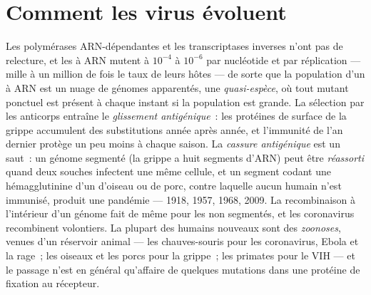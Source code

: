 \section{Comment les virus évoluent}

\begin{definition}\label{def:b3:virology:evolution}
Les polymérases ARN-dépendantes et les transcriptases inverses n'ont
pas de relecture, et les  à ARN mutent à $10^{-4}$ à $10^{-6}$ par
nucléotide et par réplication --- mille à un million de fois le taux de
leurs hôtes --- de sorte que la population d'un  à ARN est un nuage
de génomes apparentés, une \emph{quasi-espèce}, où tout mutant ponctuel
est présent à chaque instant si la population est grande. La sélection
par les anticorps entraîne le \emph{glissement antigénique}~: les
protéines de surface de la grippe accumulent des substitutions année
après année, et l'immunité de l'an dernier protège un peu moins à
chaque saison. La \emph{cassure antigénique} est un saut~: un génome
segmenté (la grippe a huit segments d'ARN) peut être \emph{réassorti}
quand deux souches infectent une même cellule, et un segment codant une
hémagglutinine d'un  d'oiseau ou de porc, contre laquelle aucun
humain n'est immunisé, produit une pandémie --- 1918, 1957, 1968, 2009.
La recombinaison à l'intérieur d'un génome fait de même pour les 
non segmentés, et les coronavirus recombinent volontiers. La plupart
des  humains nouveaux sont des \emph{zoonoses}, venues d'un
réservoir animal --- les chauves-souris pour les coronavirus, Ebola et
la rage~; les oiseaux et les porcs pour la grippe~; les primates pour
le VIH --- et le passage n'est en général qu'affaire de quelques
mutations dans une protéine de fixation au récepteur.
\end{definition}

